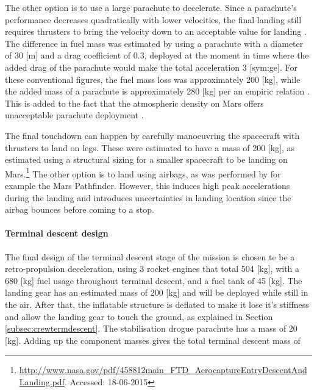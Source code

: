 The other option is to use a large parachute to decelerate. Since a parachute's performance decreases quadratically with lower velocities, the final landing still requires thrusters to bring the velocity down to an acceptable value for landing \cite{Braun2007}. The difference in fuel mass was estimated by using a parachute with a diameter of 30 [m] and a drag coefficient of 0.3, deployed at the moment in time where the added drag of the parachute would make the total acceleration 3 [\gls{sym:ge}]. For these conventional figures, the fuel mass loss was approximately 200 [kg], while the added mass of a parachute is approximately 280 [kg] per an empiric relation \cite{Anderson1969}. This is added to the fact that the atmospheric density on Mars offers unacceptable parachute deployment \cite{Korzun2009}.

The final touchdown can happen by carefully manoeuvring the spacecraft with thrusters to land on legs. These were estimated to have a mass of 200 [kg], as estimated using a structural sizing for a smaller spacecraft to be landing on Mars.\footnote{\url{http://www.nasa.gov/pdf/458812main_FTD_AerocaptureEntryDescentAndLanding.pdf}. Accessed: 18-06-2015} The other option is to land using airbags, as was performed by for example the Mars Pathfinder. However, this induces high peak accelerations during the landing and introduces uncertainties in landing location since the airbag bounces before coming to a stop.

\paragraph{Terminal descent design}
The final design of the terminal descent stage of the mission is chosen te be a retro-propulsion deceleration, using 3 rocket engines that total 504 [kg], with a 680 [kg] fuel usage throughout terminal descent, and a fuel tank of 45 [kg]. The landing gear has an estimated mass of 200 [kg] and will be deployed while still in the air. After that, the inflatable structure is deflated to make it lose it's stiffness and allow the landing gear to touch the ground, as explained in Section \ref{subsec:crewtermdescent}. The stabilisation drogue parachute has a mass of 20 [kg]. Adding up the component masses gives the total terminal descent mass of 